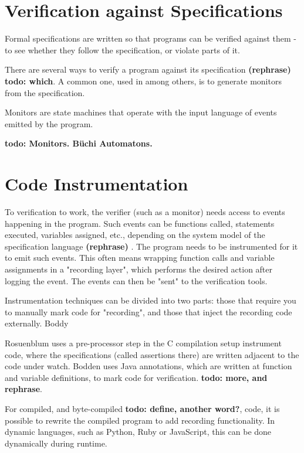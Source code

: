 \documentclass[a4paper,11pt]{kth-mag}
\newcommand{\todo}[1]{\textbf{todo: #1}}
\newcommand{\rephrase}{\textbf{(rephrase)} }
\begin{document}
\section{Verification against Specifications} \label{section-verification}

Formal specifications are written so that programs can be verified against them
- to see whether they follow the specification, or violate parts of it.

There are several ways to verify a program against its specification \rephrase
\todo{which}. A common one, used in
\cite{bauer06monitoring,bodden05efficientrv} among others, is to generate
monitors from the specification.

Monitors are state machines that operate with the input language of events
emitted by the program.

\todo{Monitors. Büchi Automatons.}

\section{Code Instrumentation} \label{section-instrumentation}

To verification to work, the verifier (such as a monitor) needs access to
events happening in the program. Such events can be functions called,
statements executed, variables assigned, etc., depending on the system model of
the specification language \rephrase. The program needs to be instrumented for
it to emit such events. This often means wrapping function calls and variable
assignments in a "recording layer", which performs the desired action after
logging the event.  The events can then be "sent" to the verification tools.

Instrumentation techniques can be divided into two parts: those that require
you to manually mark code for "recording", and those that inject the recording
code externally. Boddy

Rosuenblum \cite{rosenblum95practicalassertions} uses a pre-processor step in
the C compilation setup instrument code, where the specifications (called
assertions there) are written adjacent to the code under watch. Bodden
\cite{bodden05efficientrv} uses Java annotations, which are written at function
and variable definitions, to mark code for verification. \todo{more, and
rephrase}.

For compiled, and byte-compiled \todo{define, another word?}, code, it is
possible to rewrite the compiled program to add recording functionality. In
dynamic languages, such as Python, Ruby or JavaScript, this can be done
dynamically during runtime.
\end{document}
